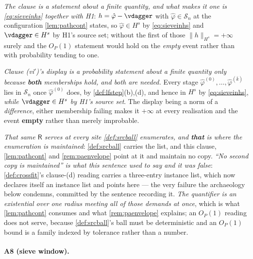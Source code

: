 \medskip
\noindent
\emph{The clause is a statement about a
finite quantity, and what makes it one is \eqref{eq:sieveinhs} together with H1}:
$h=\hat\varphi-\vdagger$ with $\hat\varphi\in\mathcal S_n$ at the configuration
\cref{lem:pathcont} states, so $\hat\varphi\in H^{s}$ by \eqref{eq:sieveinhs} and $\vdagger\in H^{s}$
by H1's source set; without the first of those $\|h\|_{H^{s}}=+\infty$ surely and the
$O_P(1)$ statement would hold on the \emph{empty} event rather than with probability tending to one.

\medskip
\noindent
\emph{Clause \textup{(vi$'$)}'s display is a probability statement about a finite quantity only because
\textbf{both} memberships hold, and both are needed.} Every stage
$\hat\varphi^{(0)},\dots,\hat\varphi^{(\bar k)}$ lies in $\mathcal S_n$ once $\hat\varphi^{(0)}$ does, by
\cref{def:lfstep}\textup{(b)},\textup{(d)}, and hence in $H^{s}$ by \eqref{eq:sieveinhs}, \emph{while
$\vdagger\in H^{s}$ by H1's source set}. The display being a norm of a \emph{difference}, either
membership failing makes it $+\infty$ at every realisation and the event \textbf{empty} rather than
merely improbable.

\medskip
\noindent
\emph{That same $\mathsf R$ serves at every site \cref{def:srcball} enumerates, and \textbf{that} is
where the enumeration is maintained}: \cref{def:srcball} carries the list, and this clause,
\cref{lem:pathcont} and \cref{rem:paenvelope} point at it and maintain no copy.
\emph{``No second copy is maintained'' is what this sentence used to say and it was false}:
\cref{def:crossfit}'s clause-\textup{(d)} reading carries a three-entry instance list, which now
declares itself an instance list and points here --- the very failure the archaeology below
condemns, committed by the sentence recording it.
\emph{The quantifier is an existential over
one radius meeting all of those demands at once}, which is what \cref{lem:pathcont} consumes and what
\cref{rem:paenvelope} explains; an $O_P(1)$ reading does not serve, because \cref{def:srcball}'s ball must
be deterministic and an $O_P(1)$ bound is a family indexed by tolerance rather than a number.

\paragraph{A8 (sieve window).}


